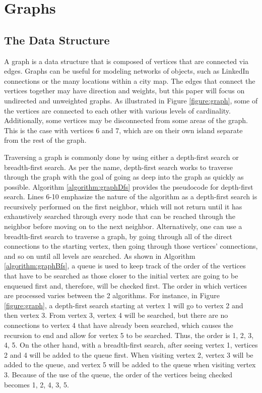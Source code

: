 \documentclass[letterpaper, 10pt,DIV=13]{scrartcl}
\numberwithin{equation}{section} %
\numberwithin{figure}{section} %
\numberwithin{table}{section} %
\begin{document}
\section{Graphs}
\subsection{The Data Structure}
A graph is a data structure that is composed of vertices that are connected via edges. Graphs can be useful for modeling networks of objects, such as LinkedIn connections or the many locations within a city map. The edges that connect the vertices together may have direction and weights, but this paper will focus on undirected and unweighted graphs. As illustrated in Figure \ref{figure:graph}, some of the vertices are connected to each other with various levels of cardinality. Additionally, some vertices may be disconnected from some areas of the graph. This is the case with vertices 6 and 7, which are on their own island separate from the rest of the graph.

Traversing a graph is commonly done by using either a depth-first search or breadth-first search. As per the name, depth-first search works to traverse through the graph with the goal of going as deep into the graph as quickly as possible. Algorithm \ref{algorithm:graphDfs} provides the pseudocode for depth-first search. Lines 6-10 emphasize the nature of the algorithm as a depth-first search is recursively performed on the first neighbor, which will not return until it has exhaustively searched through every node that can be reached through the neighbor before moving on to the next neighbor. Alternatively, one can use a breadth-first search to traverse a graph, by going through all of the direct connections to the starting vertex, then going through those vertices' connections, and so on until all levels are searched. As shown in Algorithm \ref{algorithm:graphBfs}, a queue is used to keep track of the order of the vertices that have to be searched as those closer to the initial vertex are going to be enqueued first and, therefore, will be checked first. The order in which vertices are processed varies between the 2 algorithms. For instance, in Figure \ref{figure:graph}, a depth-first search starting at vertex 1 will go to vertex 2 and then vertex 3. From vertex 3, vertex 4 will be searched, but there are no connections to vertex 4 that have already been searched, which causes the recursion to end and allow for vertex 5 to be searched. Thus, the order is 1, 2, 3, 4, 5. On the other hand, with a breadth-first search, after seeing vertex 1, vertices 2 and 4 will be added to the queue first. When visiting vertex 2, vertex 3 will be added to the queue, and vertex 5 will be added to the queue when visiting vertex 3. Because of the use of the queue, the order of the vertices being checked becomes 1, 2, 4, 3, 5.
\end{document}
